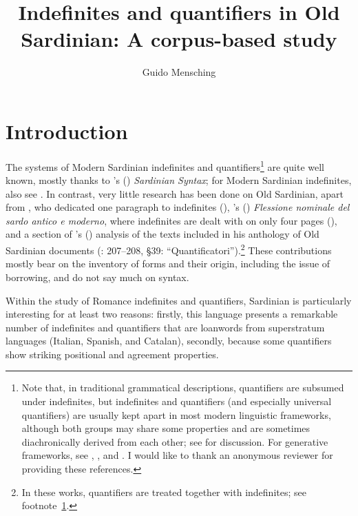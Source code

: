 \documentclass[output=paper,colorlinks,citecolor=brown]{langscibook}
\author{Guido Mensching\orcid{}\affiliation{Georg-August-Universität Göttingen}}
\title{Indefinites and quantifiers in Old Sardinian: A corpus-based study}
\begin{document}
\maketitle

\section{Introduction}\label{sec:men1}
\begin{sloppypar}
The systems of Modern Sardinian indefinites and quantifiers\footnote{\label{fn:men1}Note that, in traditional grammatical descriptions, quantifiers are subsumed under indefinites, but indefinites and quantifiers (and especially universal quantifiers) are usually kept apart in most modern linguistic frameworks, although both groups may share some properties and are sometimes diachronically derived from each other; see \citet[11--13]{Haspelmath1997} for discussion. For generative frameworks, see \citet{Heim1982}, \citet{BeghelliStowell1997}, and \citet{Szabolcsi1997}. I would like to thank an anonymous reviewer for providing these references.} are quite well known, mostly thanks to \citeauthor{Jones1993}’s (\citeyear{Jones1993}) \textit{Sardinian Syntax}; for Modern Sardinian indefinites, also see \citet{Mensching2005}. In contrast, very little research has been done on Old Sardinian, apart from  \citet{MeyerLübke1902}, who dedicated one paragraph to indefinites (\citeyear[40--41]{MeyerLübke1902}), \citeauthor{Wagner1938}’s (\citeyear{Wagner1938}) \textit{Flessione nominale del sardo antico e moderno}, where indefinites are dealt with on only four pages (\citeyear[128--132, §§40--46]{Wagner1938}), and a section of \citeauthor{BlascoFerrer2003}’s (\citeyear{BlascoFerrer2003}) analysis of the texts included in his anthology of Old Sardinian documents (\citeyear{BlascoFerrer2003}: 207--208, §39: “Quantificatori”).\footnote{In these works, quantifiers are treated together with indefinites; see footnote~\ref{fn:men1}.} These contributions mostly bear on the inventory of forms and their origin, including the issue of borrowing, and do not say much on syntax. 
\end{sloppypar}

Within the study of Romance indefinites and quantifiers, Sardinian is particularly interesting for at least two reasons: firstly, this language presents a remarkable number of indefinites and quantifiers that are loanwords from superstratum languages (Italian, Spanish, and Catalan), secondly, because some quantifiers show striking positional and agreement properties. 
\end{document}
